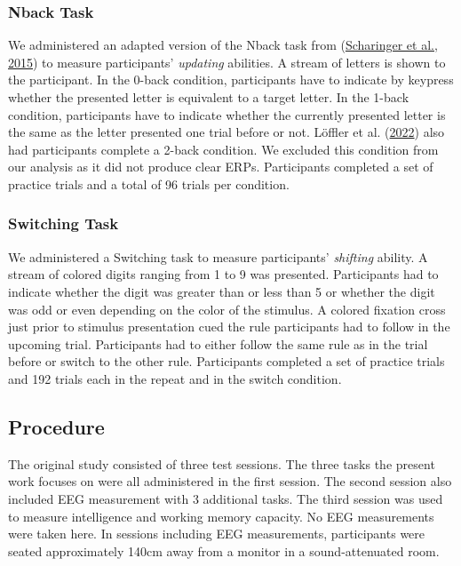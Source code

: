 \documentclass[
  man]{apa7}
\begin{document}
\hypertarget{nback-task}{%
\subsubsection{Nback Task}\label{nback-task}}

We administered an adapted version of the Nback task from (\protect\hyperlink{ref-scharinger2015flanker}{Scharinger et al., 2015}) to measure participants' \emph{updating} abilities. A stream of letters is shown to the participant. In the 0-back condition, participants have to indicate by keypress whether the presented letter is equivalent to a target letter. In the 1-back condition, participants have to indicate whether the currently presented letter is the same as the letter presented one trial before or not. Löffler et al. (\protect\hyperlink{ref-loffler2022common}{2022}) also had participants complete a 2-back condition. We excluded this condition from our analysis as it did not produce clear ERPs. Participants completed a set of practice trials and a total of 96 trials per condition.

\hypertarget{switching-task}{%
\subsubsection{Switching Task}\label{switching-task}}

We administered a Switching task to measure participants' \emph{shifting} ability. A stream of colored digits ranging from 1 to 9 was presented. Participants had to indicate whether the digit was greater than or less than 5 or whether the digit was odd or even depending on the color of the stimulus. A colored fixation cross just prior to stimulus presentation cued the rule participants had to follow in the upcoming trial. Participants had to either follow the same rule as in the trial before or switch to the other rule. Participants completed a set of practice trials and 192 trials each in the repeat and in the switch condition.

\hypertarget{procedure}{%
\subsection{Procedure}\label{procedure}}

The original study consisted of three test sessions. The three tasks the present work focuses on were all administered in the first session. The second session also included EEG measurement with 3 additional tasks. The third session was used to measure intelligence and working memory capacity. No EEG measurements were taken here. In sessions including EEG measurements, participants were seated approximately 140cm away from a monitor in a sound-attenuated room.
\end{document}
